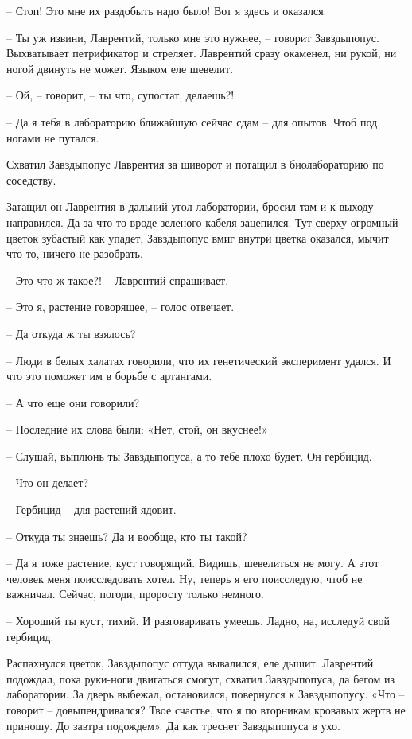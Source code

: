 \documentclass[ebook,oneside,final,openright]{memoir}
\begin{document}
– Стоп! Это мне их раздобыть надо было! Вот я здесь и оказался.\par
– Ты уж извини, Лаврентий, только мне это нужнее, – говорит Завздыпопус. Выхватывает петрификатор и стреляет. Лаврентий сразу окаменел, ни рукой, ни ногой двинуть не может. Языком еле шевелит.\par
– Ой, – говорит, – ты что, супостат, делаешь?!\par
– Да я тебя в лабораторию ближайшую сейчас сдам – для опытов. Чтоб под ногами не путался.\par
Схватил Завздыпопус Лаврентия за шиворот и потащил в биолабораторию по соседству.\par
\par
Затащил он Лаврентия в дальний угол лаборатории, бросил там и к выходу направился. Да за что-то вроде зеленого кабеля зацепился. Тут сверху огромный цветок зубастый как упадет, Завздыпопус вмиг внутри цветка оказался, мычит что-то, ничего не разобрать.\par
\par
– Это что ж такое?! – Лаврентий спрашивает.\par
– Это я, растение говорящее, – голос отвечает.\par
– Да откуда ж ты взялось?\par
– Люди в белых халатах говорили, что их генетический эксперимент удался. И что это поможет им в борьбе с артангами.\par
– А что еще они говорили?\par
– Последние их слова были: «Нет, стой, он вкуснее!»\par
– Слушай, выплюнь ты Завздыпопуса, а то тебе плохо будет. Он гербицид.\par
– Что он делает?\par
– Гербицид – для растений ядовит.\par
– Откуда ты знаешь? Да и вообще, кто ты такой?\par
– Да я тоже растение, куст говорящий. Видишь, шевелиться не могу. А этот человек меня поисследовать хотел. Ну, теперь я его поисследую, чтоб не важничал. Сейчас, погоди, проросту только немного.\par
– Хороший ты куст, тихий. И разговаривать умеешь. Ладно, на, исследуй свой гербицид.\par
\par
Распахнулся цветок, Завздыпопус оттуда вывалился, еле дышит. Лаврентий подождал, пока руки-ноги двигаться смогут, схватил Завздыпопуса, да бегом из лаборатории. За дверь выбежал, остановился, повернулся к Завздыпопусу. «Что – говорит – довыпендривался? Твое счастье, что я по вторникам кровавых жертв не приношу. До завтра подождем». Да как треснет Завздыпопуса в ухо.\par
\end{document}
